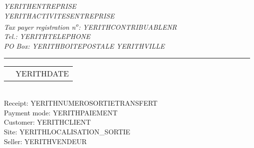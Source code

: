 \documentclass[1.75pt]{article} %
\makeatletter
\newcommand{\headerrow}[2]
{\begin{tabular*}{\linewidth}{l@{\extracolsep{\fill}}r}
	#1 &
	#2 \\
\end{tabular*}}
\makeatother
\begin{document}
\emph{YERITHENTREPRISE} \\
\emph{YERITHACTIVITESENTREPRISE} \\
\emph{Tax payer registration n\textsuperscript{o}: YERITHCONTRIBUABLENR} \\
\emph{Tel.: YERITHTELEPHONE} \\
\emph{PO Box: YERITHBOITEPOSTALE YERITHVILLE}

\vspace*{0.2cm}

\hrule

\headerrow
{}
{YERITHDATE}\\

Receipt: YERITHNUMEROSORTIETRANSFERT\\
Payment mode: YERITHPAIEMENT\\
Customer: YERITHCLIENT\\
Site: YERITHLOCALISATION_SORTIE\\
Seller: YERITHVENDEUR

\vspace*{0.2cm}

\end{document}

